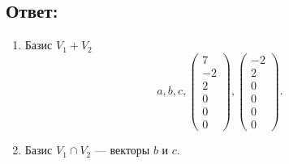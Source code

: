 \documentclass[12pt]{article}
\begin{document}
    \subsection*{Ответ:}
    \begin{enumerate}
        \item
        Базис $V_1 + V_2$
        \[
            a, b, c ,
            \begin{pmatrix}
                7 \\ -2 \\ 2 \\ 0 \\ 0 \\ 0
            \end{pmatrix} ,
            \begin{pmatrix}
                -2 \\ 2 \\ 0 \\ 0 \\ 0 \\ 0
            \end{pmatrix} .
        \]

        \item
        Базис $V_1 \cap V_2$ --- векторы $b$ и $c$.
    \end{enumerate}
\end{document}
